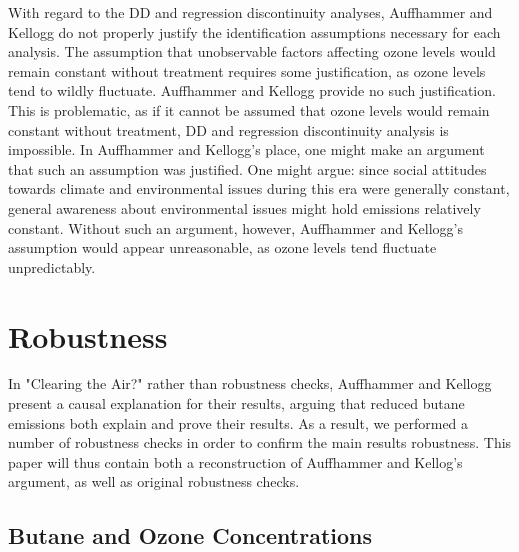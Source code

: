 \documentclass{article}
\begin{document}
With regard to the DD and regression discontinuity analyses, Auffhammer and Kellogg do not properly justify the identification assumptions necessary for each analysis. The assumption that unobservable factors affecting ozone levels would remain constant without treatment requires some justification, as ozone levels tend to wildly fluctuate. Auffhammer and Kellogg provide no such justification. This is problematic, as if it cannot be assumed that ozone levels would remain constant without treatment, DD and regression discontinuity analysis is impossible. In Auffhammer and Kellogg's place, one might make an argument that such an assumption was justified. One might argue: since social attitudes towards climate and environmental issues during this era were generally constant, general awareness about environmental issues might hold emissions relatively constant. Without such an argument, however, Auffhammer and Kellogg's assumption would appear unreasonable, as ozone levels tend fluctuate unpredictably.

\section{Robustness}

 In "Clearing the Air?" rather than robustness checks, Auffhammer and Kellogg present a causal explanation for their results, arguing that reduced butane emissions both explain and prove their results. As a result, we performed a number of robustness checks in order to confirm the main results robustness. This paper will thus contain both a reconstruction of Auffhammer and Kellog's argument, as well as original robustness checks.

\subsection{Butane and Ozone Concentrations}
\end{document}
